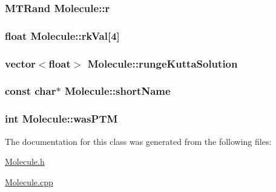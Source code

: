\label{classMolecule_ae6aff39305dd77531ea5a213b6f2b1c5}
\hypertarget{classMolecule_af036bbaa1f3ec537d3711ae3242d3074}{
\subsubsection[{r}]{\setlength{\rightskip}{0pt plus 5cm}MTRand {\bf Molecule::r}}}
\label{classMolecule_af036bbaa1f3ec537d3711ae3242d3074}
\hypertarget{classMolecule_a36d750dfda76602691edfb988f6aee42}{
\subsubsection[{rkVal}]{\setlength{\rightskip}{0pt plus 5cm}float {\bf Molecule::rkVal}\mbox{[}4\mbox{]}}}
\label{classMolecule_a36d750dfda76602691edfb988f6aee42}
\hypertarget{classMolecule_a3e3be6cd7b1286e8d8d489642ab19641}{
\subsubsection[{rungeKuttaSolution}]{\setlength{\rightskip}{0pt plus 5cm}vector$<$float$>$ {\bf Molecule::rungeKuttaSolution}}}
\label{classMolecule_a3e3be6cd7b1286e8d8d489642ab19641}
\hypertarget{classMolecule_ae79f60ef35ffcb500e91013f59563e03}{
\subsubsection[{shortName}]{\setlength{\rightskip}{0pt plus 5cm}const char$\ast$ {\bf Molecule::shortName}}}
\label{classMolecule_ae79f60ef35ffcb500e91013f59563e03}
\hypertarget{classMolecule_a134dd5ffa71953792912c7b0cca01405}{
\subsubsection[{wasPTM}]{\setlength{\rightskip}{0pt plus 5cm}int {\bf Molecule::wasPTM}}}
\label{classMolecule_a134dd5ffa71953792912c7b0cca01405}


The documentation for this class was generated from the following files:\begin{DoxyCompactItemize}
\item 
\hyperlink{Molecule_8h}{Molecule.h}\item 
\hyperlink{Molecule_8cpp}{Molecule.cpp}\end{DoxyCompactItemize}
